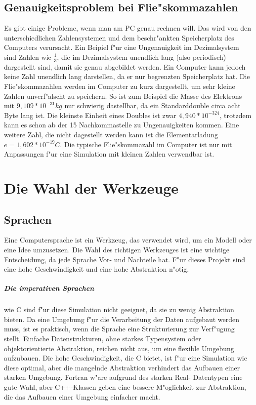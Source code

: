 \documentclass[14pt, a4paper]{report}
\begin{document}
\section{Genauigkeitsproblem bei Flie"skommazahlen}
Es gibt einige Probleme, wenn man am PC genau rechnen will. Das wird von den 
unterschiedlichen Zahlensystemen und dem beschr"ankten Speicherplatz des Computers 
verursacht. Ein Beipiel f"ur eine Ungenauigkeit im Dezimalsystem sind Zahlen
wie $\frac{1}{3}$, die im Dezimalsystem unendlich lang (also periodisch)
 dargestellt sind, damit sie genau
abgebildet werden. Ein Computer kann jedoch keine Zahl unendlich lang darstellen, da
er nur begrenzten Speicherplatz hat. Die Flie"skommazahlen werden im Computer zu kurz
dargestellt, um sehr kleine Zahlen unverf"alscht zu speichern. So ist zum Beispiel die 
Masse des Elektrons mit $9,109 * 10^{-31} kg$ nur schwierig dastellbar, da ein 
Standarddouble circa acht Byte lang ist. Die kleinste Einheit eines Doubles ist zwar
$4,940 * 10^{-324}$, trotzdem kann es schon ab der 15 Nachkommastelle zu 
Ungenauigkeiten kommen. Eine weitere Zahl, die nicht dagestellt werden
kann ist die Elementarladung $e = 1,602 * 10^{-19} C$. Die typische 
Flie"skommazahl im Computer ist nur mit Anpassungen f"ur eine Simulation mit kleinen
Zahlen verwendbar ist.

\chapter{Die Wahl der Werkzeuge}
\section{Sprachen}
Eine Computersprache ist ein Werkzeug, das verwendet wird, um ein Modell oder eine Idee
umzusetzen. Die Wahl des richtigen Werkzeuges ist eine wichtige Entscheidung, da jede
Sprache Vor- und Nachteile hat. F"ur dieses Projekt sind eine hohe Geschwindigkeit 
und eine hohe Abstraktion n"otig.

\paragraph{Die imperativen Sprachen} wie C sind f"ur diese Simulation
nicht geeignet, da sie zu wenig Abstraktion bieten. Da eine Umgebung f"ur die 
Verarbeitung der Daten aufgebaut werden 
muss, ist es praktisch, wenn die Sprache eine Strukturierung zur Verf"ugung 
stellt. Einfache Datenstrukturen, ohne starkes Typensystem oder 
objektorientierte Abstraktion,
reichen nicht aus, um eine flexible Umgebung aufzubauen. Die hohe Geschwindigkeit, die
C bietet, ist f"ur eine Simulation wie diese optimal, aber die mangelnde Abstraktion
verhindert das Aufbauen einer starken Umgebung. Fortran w"are aufgrund des starken Real-
Datentypen eine gute Wahl, aber C++-Klassen geben eine bessere M"oglichkeit zur 
Abstraktion, die das Aufbauen einer Umgebung einfacher macht.
\end{document}
